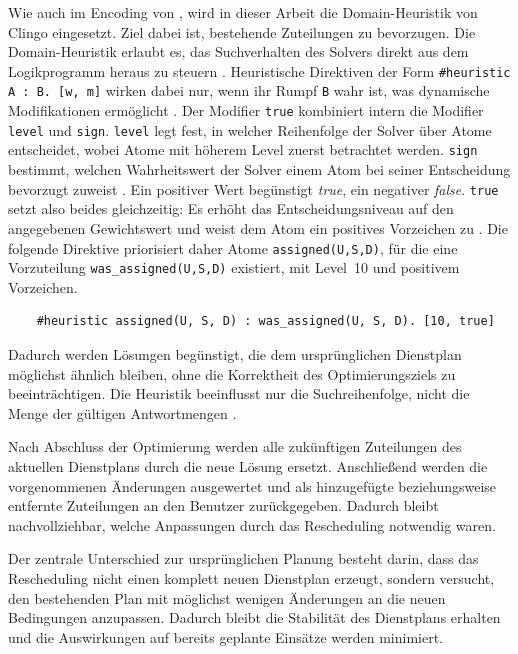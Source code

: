 Wie auch im Encoding von \textcite{nabeshimaASPbasedNurseScheduling2026}, wird in dieser Arbeit die Domain-Heuristik von Clingo eingesetzt. Ziel dabei ist, bestehende Zuteilungen zu bevorzugen. Die Domain-Heuristik erlaubt es, das Suchverhalten des Solvers direkt aus dem Logikprogramm heraus zu steuern \parencite{potasscoGuide}. Heuristische Direktiven der Form \texttt{\#heuristic A : B. [w, m]} wirken dabei nur, wenn ihr Rumpf \texttt{B} wahr ist, was dynamische Modifikationen ermöglicht \parencite{potasscoGuide}.
Der Modifier \texttt{true} kombiniert intern die Modifier \texttt{level} und \texttt{sign}. \texttt{level} legt fest, in welcher Reihenfolge der Solver über Atome entscheidet, wobei Atome mit höherem Level zuerst betrachtet werden. \texttt{sign} bestimmt, welchen Wahrheitswert der Solver einem Atom bei seiner Entscheidung bevorzugt zuweist \parencite{potasscoGuide}. Ein positiver Wert begünstigt \textit{true}, ein negativer \textit{false}. \texttt{true} setzt also beides gleichzeitig: Es erhöht das Entscheidungsniveau auf den angegebenen Gewichtswert und weist dem Atom ein positives Vorzeichen zu \parencite{potasscoGuide}.
Die folgende Direktive priorisiert daher Atome \texttt{assigned(U,S,D)}, für die eine Vorzuteilung \texttt{was\_assigned(U,S,D)} existiert, mit Level~10 und positivem Vorzeichen.
\begin{lstlisting}
	#heuristic assigned(U, S, D) : was_assigned(U, S, D). [10, true]
\end{lstlisting}
Dadurch werden Lösungen begünstigt, die dem ursprünglichen Dienstplan möglichst ähnlich bleiben, ohne die Korrektheit des Optimierungsziels zu beeinträchtigen. Die Heuristik beeinflusst nur die Suchreihenfolge, nicht die Menge der gültigen Antwortmengen \parencite{potasscoGuide}.

Nach Abschluss der Optimierung werden alle zukünftigen Zuteilungen des aktuellen Dienstplans durch die neue Lösung ersetzt. Anschließend werden die vorgenommenen Änderungen ausgewertet und als hinzugefügte beziehungsweise entfernte Zuteilungen an den Benutzer zurückgegeben. Dadurch bleibt nachvollziehbar, welche Anpassungen durch das Rescheduling notwendig waren.

Der zentrale Unterschied zur ursprünglichen Planung besteht darin, dass das Rescheduling nicht einen komplett neuen Dienstplan erzeugt, sondern versucht, den bestehenden Plan mit möglichst wenigen Änderungen an die neuen Bedingungen anzupassen. Dadurch bleibt die Stabilität des Dienstplans erhalten und die Auswirkungen auf bereits geplante Einsätze werden minimiert.

